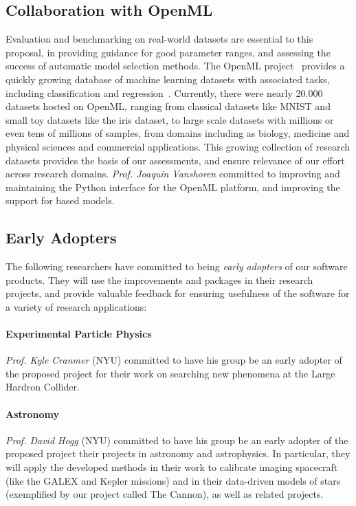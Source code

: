 \subsection{Collaboration with OpenML}
Evaluation and benchmarking on real-world datasets are essential to this
proposal, in providing guidance for good parameter ranges, and assessing the
success of automatic model selection methods. The OpenML
project~\autocite{van2013openml} provides a quickly growing database of machine
learning datasets with associated tasks, including classification and
regression~\autocite{vanschoren2014openml}. Currently, there
were nearly 20.000 datasets hosted on OpenML, ranging from classical datasets
like MNIST and small toy datasets like the iris dataset, to large
scale datasets with millions or even tens of millions of samples, from domains
including as biology, medicine and physical sciences and commercial applications.
This growing collection of research datasets provides the basis of our
assessments, and ensure relevance of our effort across research domains.
\emph{Prof. Joaquin Vanshoren} committed to improving and maintaining the Python
interface for the OpenML platform, and improving the support for \sklearn{}
based models.

\subsection{Early Adopters}
The following researchers have committed to being \emph{early adopters} of our
software products. They will use the improvements and packages in their
research projects, and provide valuable feedback for ensuring usefulness of the
software for a variety of research applications:

\paragraph{Experimental Particle Physics}
\emph{Prof. Kyle Cranmer} (NYU) committed to have his group be an early adopter of the
proposed project for their work on searching new phenomena at the Large Hardron
Collider.

\paragraph{Astronomy}
\emph{Prof. David Hogg} (NYU) committed to have his group be an
early adopter of the proposed project their projects in astronomy and
astrophysics. In particular, they will apply the developed methods in their
work to calibrate imaging spacecraft (like the GALEX and Kepler missions) and
in their data-driven models of stars (exemplified by our project called The
Cannon), as well as related projects.

